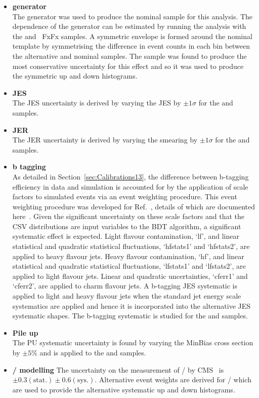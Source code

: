 \begin{itemize}
\item \textbf{\ttbar generator}\\
The \POWHEG generator was used to produce the nominal \ttbar sample for this analysis. The dependence of the generator can be estimated by running the analysis with the \MLM and \MADGRAPH\aMCATNLO~FxFx \ttbar samples. A symmetric envelope is formed around the nominal template by symmetrising the difference in event counts in each bin between the alternative and nominal samples. The \MLM sample was found to produce the most conservative uncertainty for this effect and so it was used to produce the symmetric up and down histograms.
\item \textbf{JES}\\
The JES uncertainty is derived by varying the JES by $\pm1\sigma$ for the \ttbar and \tttt samples.
\item \textbf{JER}\\
The JER uncertainty is derived by varying the smearing by $\pm1\sigma$ for the \ttbar and \tttt samples.
\item \textbf{b tagging}\\
As detailed in Section~\ref{sec:Calibrations13}, the difference between b-tagging efficiency in data and simulation is accounted for by the application of scale factors to simulated events via an event weighting procedure. This event weighting procedure was developed for Ref.~\cite{CMS-PAS-HIG-16-004}, details of which are documented here~\cite{CMS-NOTE-2013-130}. Given the significant uncertainty on these scale factors and that the CSV distributions are input variables to the BDT algorithm, a significant systematic effect is expected. Light flavour contamination, `lf', and linear statistical and quadratic statistical fluctuations, `hfstats1' and `hfstats2', are applied to heavy flavour jets. Heavy flavour contamination, `hf', and linear statistical and quadratic statistical fluctuations, `lfstats1' and `lfstats2', are applied to light flavour jets. Linear and quadratic uncertainties, `cferr1' and `cferr2', are applied to charm flavour jets. A b-tagging JES systematic is applied to light and heavy flavour jets when the standard jet energy scale systematics are applied and hence it is incorporated into the alternative JES systematic shapes. The b-tagging systematic is studied for the \ttbar and \tttt samples.
\item \textbf{Pile up}\\
The PU systematic uncertainty is found by varying the MinBias cross section by $\pm5\%$ and is applied to the \ttbar and \tttt samples.
\item \textbf{\heavyflavourone / \heavyflavourtwo modelling}
The uncertainty on the measurement of \heavyflavourone / \heavyflavourtwo by CMS~\cite{Khachatryan2015132} is $\pm 0.3 \left( \textrm{stat.} \right) \pm 0.6 \left(\textrm{sys.} \right)$. Alternative event weights are derived for \heavyflavourone / \heavyflavourtwo which are used to provide the alternative systematic up and down histograms.
\end{itemize}




